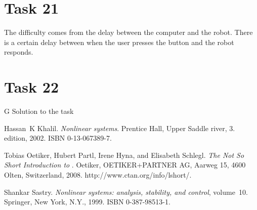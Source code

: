 \documentclass[a4paper,12pt,oneside,onecolumn]{article} %
\begin{document}
\section*{Task 21}

The difficulty comes from the delay between the computer and the
robot. There is a certain delay between when the user presses the button
and the robot responds. 
\section*{Task 22}
G
Solution to the task




\begin{thebibliography}{99}
Hassan~K Khalil.
\newblock \emph{Nonlinear systems}.
\newblock Prentice Hall, Upper Saddle river, 3. edition, 2002.
\newblock ISBN 0-13-067389-7.

Tobias Oetiker, Hubert Partl, Irene Hyna, and Elisabeth Schlegl.
\newblock \emph{The Not So Short Introduction to \LaTeXe}.
\newblock Oetiker, OETIKER+PARTNER AG, Aarweg 15, 4600 Olten, Switzerland,
  2008.
\newblock http://www.ctan.org/info/lshort/.

Shankar Sastry.
\newblock \emph{Nonlinear systems: analysis, stability, and control},
  volume~10.
\newblock Springer, New York, N.Y., 1999.
\newblock ISBN 0-387-98513-1.
\end{thebibliography}
\end{document}
